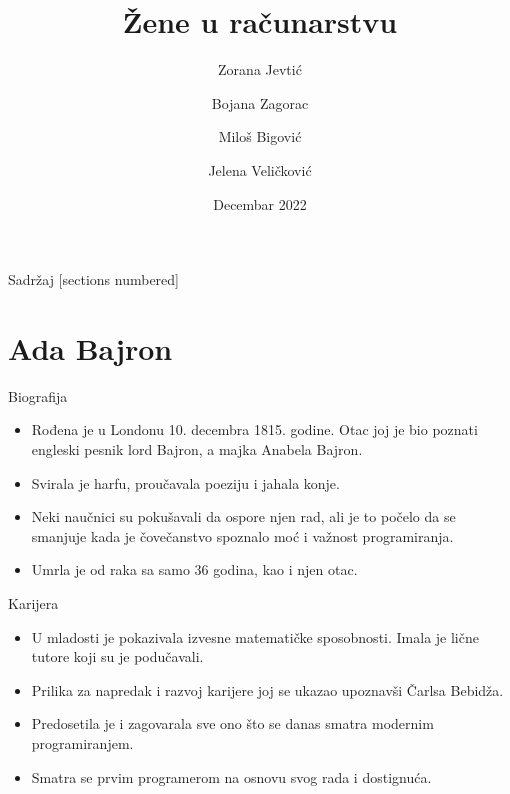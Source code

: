 \documentclass[aspectratio=169]{beamer}
\title{Žene u računarstvu}
\author{ Zorana Jevtić \and Bojana Zagorac\\  \and Miloš Bigović  \and Jelena Veličković\\}
\date{Decembar 2022}
\begin{document}
\titleframe  %


\begin{frame}{Sadržaj}
  [sections numbered]
  \tableofcontents[hideallsubsections]
\end{frame}

\section{Ada Bajron}

\begin{frame}{Biografija}
\begin{itemize}
        \item<1-> Rođena je u Londonu 10. decembra 1815. godine. Otac joj je bio poznati engleski pesnik lord Bajron, a majka Anabela Bajron.

        \item<2-> Svirala je harfu, proučavala poeziju i jahala konje.
        
        \item<3-> Neki naučnici su pokušavali da ospore njen rad, ali je to počelo da se smanjuje kada je čovečanstvo spoznalo moć i važnost programiranja.

        \item<4-> Umrla je od raka sa samo 36 godina, kao i njen otac.

    \end{itemize}
\end{frame}

\begin{frame}{Karijera}
    \begin{itemize}
        \item<1-> U mladosti je pokazivala izvesne matematičke sposobnosti. Imala je lične tutore koji su je podučavali. 
        
        \item<2-> Prilika za napredak i razvoj karijere joj se ukazao upoznavši Čarlsa Bebidža. 
        
        \item<3-> Predosetila je i zagovarala sve ono što se danas smatra modernim programiranjem.
        
        \item<4-> Smatra se prvim programerom na osnovu svog rada i dostignuća.
        
    \end{itemize}
\end{frame}
\end{document}
